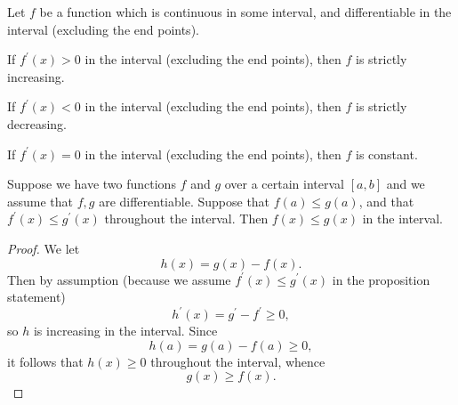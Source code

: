 \begin{theorem}
  Let $f$ be a function which is continuous in some interval, and differentiable in the interval (excluding the end points).

  If $f^\prime(x) > 0$ in the interval (excluding the end points), then $f$ is strictly increasing.

  If $f^\prime(x) < 0$ in the interval (excluding the end points), then $f$ is strictly decreasing.

  If $f^\prime(x) = 0$ in the interval (excluding the end points), then $f$ is constant.
\end{theorem}

Suppose we have two functions $f$ and $g$ over a certain interval $[a,b]$ and we assume that $f,g$ are differentiable. Suppose that $f(a) \le g(a)$, and that $f^\prime(x) \le g^\prime(x)$ throughout the interval. Then $f(x) \le g(x)$ in the interval.

\begin{proof}
  We let
  \[h(x) = g(x) - f(x).\]
  Then by assumption (because we assume $f^\prime(x) \le g^\prime(x)$ in the proposition statement)
  \[h^\prime(x) = g^\prime - f^\prime \ge 0,\]
  so $h$ is increasing in the interval. Since
  \[h(a) = g(a) - f(a) \ge 0,\]
  it follows that $h(x) \ge 0$ throughout the interval, whence
  \[g(x) \ge f(x).\]
\end{proof}
